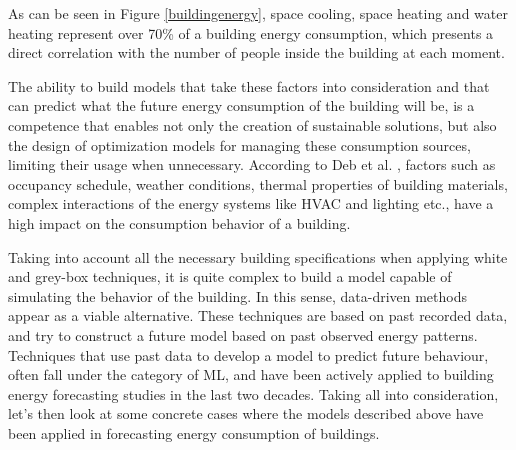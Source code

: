 As can be seen in Figure \ref{buildingenergy}, space cooling, space heating and water heating represent  over 70\% of a building energy consumption, which presents a direct correlation with  the number of people inside the building at each moment.

The ability to build models that take these factors into consideration and that can predict what the future energy consumption of the building will be, is a competence that enables not only the creation of sustainable solutions, but also the design of optimization models for managing these consumption sources, limiting their usage when unnecessary. According to Deb et al. \cite{reviewtsf}, factors such as occupancy schedule, weather conditions, thermal properties of building materials, complex interactions of the energy systems like \ac{HVAC} and lighting etc., have a high impact on the consumption behavior of a building. 

Taking into account all the necessary building specifications when applying white and grey-box techniques, it is quite complex to build a model capable of simulating the behavior of the building. In this sense, data-driven methods appear as a viable alternative. These techniques are based on past recorded data, and try to construct a future model based on past observed energy patterns. Techniques that use past data to develop a model to predict future behaviour, often fall under the category of \ac{ML}, and have been actively applied to building energy forecasting studies in the last two decades. Taking all into consideration, let's then look at some concrete cases where the models described above have been applied in forecasting energy consumption of buildings.


